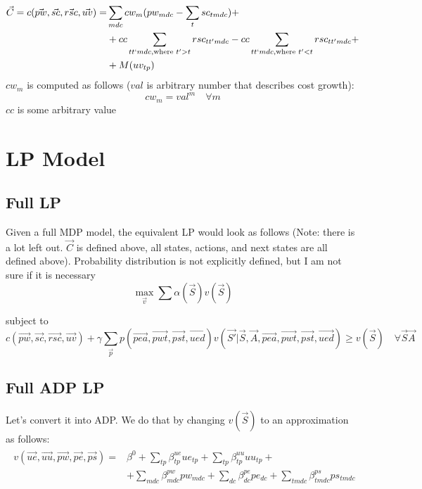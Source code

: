 \documentclass{article}
\begin{document}
\begin{align} \begin{split}  
	\vec{C} = c(\vec{pw}, \vec{sc}, \vec{rsc}, \vec{uv}) = & \sum_{mdc} cw_{m} (pw_{mdc} - \sum_{t} sc_{tmdc}) +  \\
		& + cc \sum_{tt`mdc, \text{where } t' > t} rsc_{tt'mdc} - cc \sum_{tt`mdc, \text{where } t' < t} rsc_{tt'mdc} + \\ 
		& + M (uv_{tp})
\end{split} \end{align} 
$cw_{m}$ is computed as follows ($val$ is arbitrary number that describes cost growth):
	\begin{equation}  cw_{m} = val^m \quad \forall m \end{equation} 
$cc$ is some arbitrary value

\section{LP Model}

\subsection{Full LP} 
Given a full MDP model, the equivalent LP would look as follows 
(Note: there is a lot left out. $\vec{C}$ is defined above, all states, actions, and next states are all defined above). Probability distribution is not explicitly defined, but I am not sure if it is necessary
\begin{equation}
	\max_{\vec{v}} \sum \alpha (\vec{S}) v(\vec{S}) 
\end{equation}

subject to
\begin{equation}
	c(\vec{pw}, \vec{sc}, \vec{rsc}, \vec{uv}) + \gamma \sum_{\vec{p}} p(\vec{pea}, \vec{pwt}, \vec{pst}, \vec{ued}) v( \vec{S'} | \vec{S}, \vec{A}, \vec{pea}, \vec{pwt}, \vec{pst}, \vec{ued}) \ge v(\vec{S}) \quad \forall \vec{S} \vec{A}
\end{equation}

\subsection{Full ADP LP }
Let's convert it into ADP. We do that by changing $v(\vec{S})$ to an approximation as follows:
\begin{align} \begin{split}
	v(\vec{ue}, \vec{uu}, \vec{pw}, \vec{pe}, \vec{ps}) =  & \beta^0 +
		\sum_{tp} \beta_{tp}^{ue} ue_{tp} +
		\sum_{tp} \beta_{tp}^{uu} uu_{tp} + \\
		& + \sum_{mdc} \beta_{mdc}^{pw} pw_{mdc}  + 
		\sum_{dc} \beta_{dc}^{pe} pe_{dc} + 
		\sum_{tmdc} \beta_{tmdc}^{ps} ps_{tmdc}
\end{split} \end{align}
\end{document}
